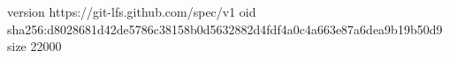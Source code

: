 version https://git-lfs.github.com/spec/v1
oid sha256:d8028681d42de5786c38158b0d5632882d4fdf4a0c4a663e87a6dea9b19b50d9
size 22000
